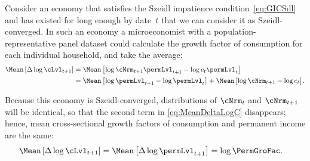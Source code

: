 \documentclass[\econtexRoot/BufferStockTheory]{subfiles}
\begin{document}
Consider an economy that satisfies the Szeidl impatience condition~\eqref{eq:GICSdl} and has existed for long enough by date~$t$ that we can consider it as Szeidl-converged.
In such an economy a microeconomist with a population-representative panel dataset could calculate the growth factor of consumption for each individual household, and take the average:
\begin{equation}\label{eq:MeanDeltaLogC}
  \begin{aligned}
    \Mean\left[\Delta \log \cLvl_{t+1}\right]  & = \Mean\left[ \log {\cNrm}_{t+1}\permLvl_{t+1} - \log c_{t}\permLvl_{t}\right]  \\
    & = \Mean\left[ \log \permLvl_{t+1}- \log \permLvl_{t}\right] + \Mean\left[ \log {\cNrm}_{t+1} - \log c_{t}\right].
  \end{aligned}
\end{equation}

Because this economy is Szeidl-converged, distributions of $\cNrm_{t}$ and $\cNrm_{t+1}$ will be identical, so that the second term in  \eqref{eq:MeanDeltaLogC} disappears; hence, mean cross-sectional growth factors of consumption and permanent income are the same:
\begin{equation}\begin{gathered}\begin{aligned}
  \Mean\left[\Delta \log \cLvl_{t+1}\right]  & = \Mean\left[ \Delta \log \permLvl_{t+1}\right] = \log \PermGroFac \label{eq:MeanDeltaLogCeqMeanDeltaLogP}.
\end{aligned}\end{gathered}\end{equation}
\end{document}
